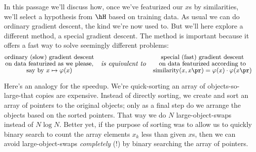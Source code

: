 \newpage
{}%
  In this passage we'll discuss how, once we've featurized our $x$s by
  similarities, we'll select a hypothesis from $\hH$ based on training data.
  As usual we can do ordinary gradient descent, the kind we're now used to.
  But we'll here explore a different method, a special gradient descent.  The
  method is important because it offers a fast way
  to solve seemingly different problems:
  $$
    \substack{\text{\small ordinary (slow) gradient descent}\\%
              \text{\small on data featurized as we please,}\\%
              \text{\small say by $x\mapsto \varphi(x)$}}
    \quad\text{\emph{is equivalent to}}\quad
    \substack{\text{\small special (fast) gradient descent}\\%
              \text{\small on data featurized according to}\\%
              \text{\small $\text{similarity}(x,x\pr)=\varphi(x)\cdot\varphi(x\pr)$}}
  $$

  Here's an analogy for the speedup.
  We're quick-sorting an array
  of objects-so-large-that copies are expensive.
  Instead of directly sorting, we create and sort an array of pointers to the
  original objects; only as a final step do we arrange the objects based on the
  sorted pointers.  That way we do $N$ large-object-swaps instead of $N\log N$.
  Better yet, if the purpose of sorting was to allow us to quickly binary
  search to count the array elements $x_k$ less than given $x$s,
  then we can avoid large-object-swaps \emph{completely} (!) by binary
  searching the array of pointers.

